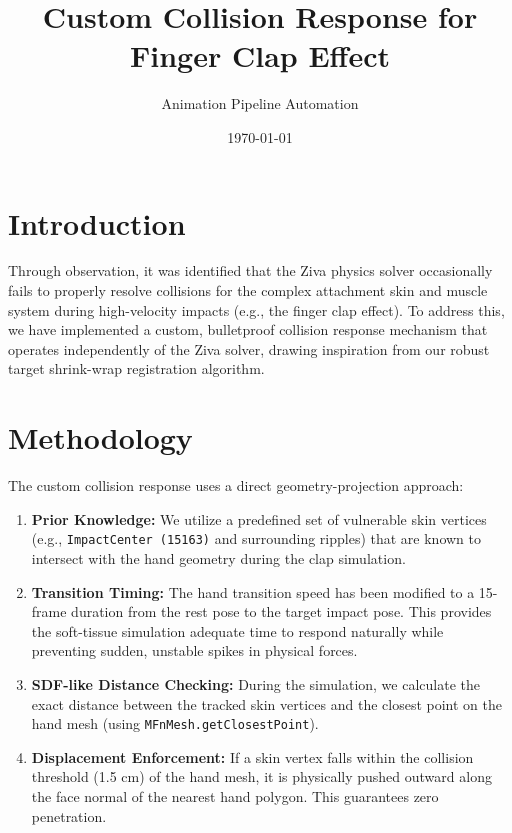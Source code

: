 \documentclass{article}
\title{Custom Collision Response for Finger Clap Effect}
\author{Animation Pipeline Automation}
\date{\today}
\begin{document}
\maketitle

\section{Introduction}
Through observation, it was identified that the Ziva physics solver occasionally fails to properly resolve collisions for the complex attachment skin and muscle system during high-velocity impacts (e.g., the finger clap effect). To address this, we have implemented a custom, bulletproof collision response mechanism that operates independently of the Ziva solver, drawing inspiration from our robust target shrink-wrap registration algorithm.

\section{Methodology}
The custom collision response uses a direct geometry-projection approach:
\begin{enumerate}
    \item \textbf{Prior Knowledge:} We utilize a predefined set of vulnerable skin vertices (e.g., \texttt{ImpactCenter (15163)} and surrounding ripples) that are known to intersect with the hand geometry during the clap simulation.
    \item \textbf{Transition Timing:} The hand transition speed has been modified to a 15-frame duration from the rest pose to the target impact pose. This provides the soft-tissue simulation adequate time to respond naturally while preventing sudden, unstable spikes in physical forces.
    \item \textbf{SDF-like Distance Checking:} During the simulation, we calculate the exact distance between the tracked skin vertices and the closest point on the hand mesh (using \texttt{MFnMesh.getClosestPoint}).
    \item \textbf{Displacement Enforcement:} If a skin vertex falls within the collision threshold (1.5 cm) of the hand mesh, it is physically pushed outward along the face normal of the nearest hand polygon. This guarantees zero penetration.
\end{enumerate}
\end{document}
